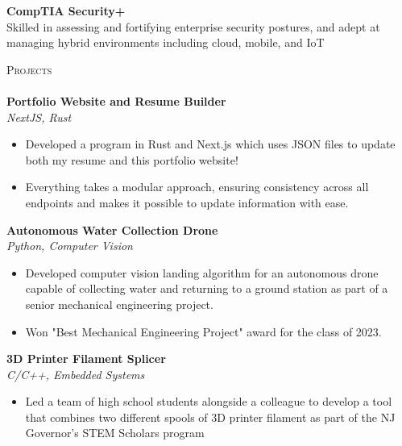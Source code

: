 \documentclass[a4paper]{article}
\newcommand{\lineunder} {
        \vspace*{-8pt} \\
        \hspace*{-18pt} \hrulefill \\
    }
\newcommand{\header} [1] {
        {\hspace*{-18pt}\vspace*{6pt} \textsc{#1}}
        \vspace*{-6pt} \lineunder
    }
\begin{document}
            {\textbf{CompTIA Security+}}\\
            Skilled in assessing and fortifying enterprise security postures, and adept at managing hybrid environments including cloud, mobile, and IoT\\
            \vspace*{2mm}
            
    \header{Projects}
    
            {\textbf{Portfolio Website and Resume Builder}}\\
            \textit{NextJS, Rust}
            \vspace{-1mm}
            \begin{itemize} \itemsep 1pt
            
                    \item Developed a program in Rust and Next.js which uses JSON files to update both my resume and this portfolio website!
                
                    \item Everything takes a modular approach, ensuring consistency across all endpoints and makes it possible to update information with ease.
                
            \end{itemize}
            \vspace*{2mm}
            
            {\textbf{Autonomous Water Collection Drone}}\\
            \textit{Python, Computer Vision}
            \vspace{-1mm}
            \begin{itemize} \itemsep 1pt
            
                    \item Developed computer vision landing algorithm for an autonomous drone capable of collecting water and returning to a ground station as part of a senior mechanical engineering project.
                
                    \item Won "Best Mechanical Engineering Project" award for the class of 2023.
                
            \end{itemize}
            \vspace*{2mm}
            
            {\textbf{3D Printer Filament Splicer}}\\
            \textit{C/C++, Embedded Systems}
            \vspace{-1mm}
            \begin{itemize} \itemsep 1pt
            
                    \item Led a team of high school students alongside a colleague to develop a tool that combines two different spools of 3D printer filament as part of the NJ Governor’s STEM Scholars program
                
            \end{itemize}
            \vspace*{2mm}
            
\end{document}
